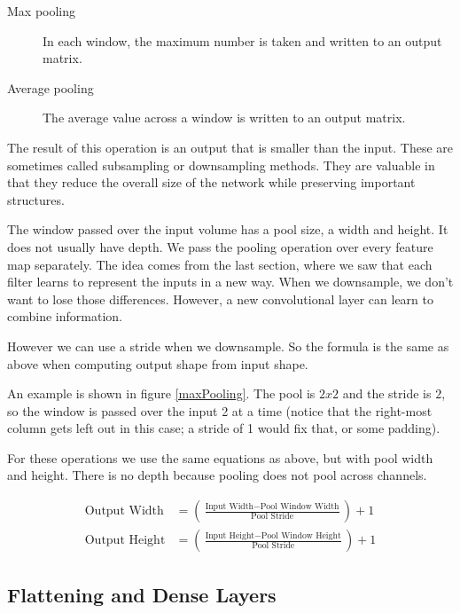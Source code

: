 \begin{description}
\item[Max pooling] In each window, the maximum number is taken and written to an output matrix.
\item[Average pooling] The average value across a window is written to an output matrix.
\end{description}
The result of this operation is an output that is smaller than the input. These are sometimes called subsampling or downsampling methods. They are valuable in that they reduce the overall size of the network while preserving important structures.

The window passed over the input volume has a pool size, a width and height. It does not usually have depth. We pass the pooling operation over every feature map separately. The idea comes from the last section, where we saw that each filter learns to represent the inputs in a new way. When we downsample, we don't want to lose those differences. However, a new convolutional layer can learn to combine information.

However we can use a stride when we downsample. So the formula is the same as above when computing output shape from input shape.

An example is shown in figure \ref{maxPooling}. The pool is $2 x 2$ and the stride is $2$, so the window is passed over the input 2 at a time (notice that the right-most column gets left out in this case; a stride of 1 would fix that, or some padding). 

For these operations we use the same equations as above, but with pool width and height. There is no depth because pooling does not pool across channels.

\begin{align*}
\text{Output Width} &= \left( \frac{\text{Input Width} - \text{Pool Window Width}}{\text{Pool Stride}} \right) + 1 \\
\text{Output Height} &= \left( \frac{\text{Input Height} - \text{Pool Window Height}}{\text{Pool Stride}} \right) + 1
\end{align*} 

\subsection{Flattening and Dense Layers}

